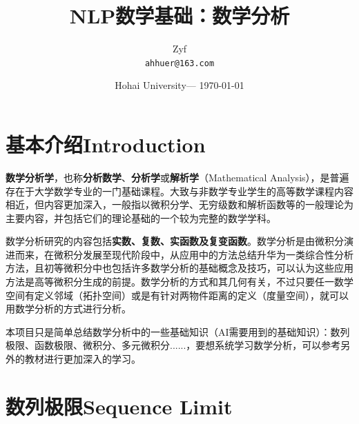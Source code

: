 \documentclass[UTF8]{ctexart}
\title{NLP数学基础：数学分析} %
\author{Zyf\\ \texttt{ahhuer@163.com}} %
\date{Hohai University--- \today} %
\begin{document}
\maketitle %


\section*{基本介绍Introduction} %

\textbf{数学分析学}，也称\textbf{分析数学}、\textbf{分析学}或\textbf{解析学}（Mathematical Analysis），是普遍存在于大学数学专业的一门基础课程。大致与非数学专业学生的高等数学课程内容相近，但内容更加深入，一般指以微积分学、无穷级数和解析函数等的一般理论为主要内容，并包括它们的理论基础的一个较为完整的数学学科。

数学分析研究的内容包括\textbf{实数、复数、实函数及复变函数}。数学分析是由微积分演进而来，在微积分发展至现代阶段中，从应用中的方法总结升华为一类综合性分析方法，且初等微积分中也包括许多数学分析的基础概念及技巧，可以认为这些应用方法是高等微积分生成的前提。数学分析的方式和其几何有关，不过只要任一数学空间有定义邻域（拓扑空间）或是有针对两物件距离的定义（度量空间），就可以用数学分析的方式进行分析。


\begin{info} %
	本项目只是简单总结数学分析中的一些基础知识（AI需要用到的基础知识）：数列极限、函数极限、微积分、多元微积分......，要想系统学习数学分析，可以参考另外的教材进行更加深入的学习。
\end{info}


\section{数列极限Sequence Limit} %
\end{document}
